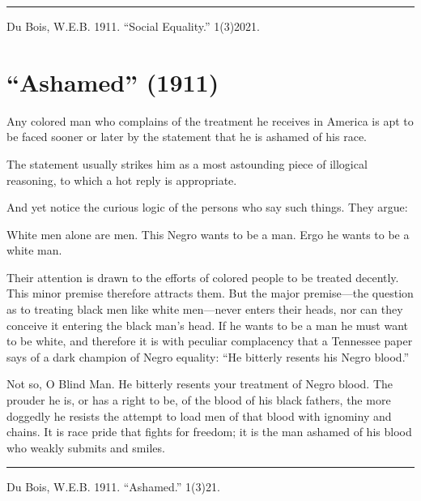 \documentclass[letterpaper,10pt,english]{jupyterBook}
\begin{document}
\bigskip\hrule\bigskip


\sphinxAtStartPar
{} Du Bois, W.E.B. 1911. “Social Equality.”  1(3)20\sphinxhyphen{}21.


\section{“Ashamed” (1911)}
\label{\detokenize{Volumes/01/03/ashamed:ashamed-1911}}\label{\detokenize{Volumes/01/03/ashamed::doc}}
\sphinxAtStartPar
Any colored man who complains of the treatment he receives in America is apt to be faced sooner or later by the statement that he is ashamed of his race.

\sphinxAtStartPar
The statement usually strikes him as a most astounding piece of illogical reasoning, to which a hot reply is appropriate.

\sphinxAtStartPar
And yet notice the curious logic of the persons who say such things. They argue:

\sphinxAtStartPar
White men alone are men. This Negro wants to be a man. Ergo he wants to be a white man.

\sphinxAtStartPar
Their attention is drawn to the efforts of colored people to be treated decently. This minor premise therefore attracts them. But the major premise—the question as to treating black men like white men—never enters their heads, nor can they conceive it entering the black man’s head. If he wants to be a man he must want to be white, and therefore it is with peculiar complacency that a Tennessee paper says of a dark champion of Negro equality: “He bitterly resents his Negro blood.”

\sphinxAtStartPar
Not so, O Blind Man. He bitterly resents your treatment of Negro blood. The prouder he is, or has a right to be, of the blood of his black fathers, the more doggedly he resists the attempt to load men of that blood with ignominy and chains. It is race pride that fights for freedom; it is the man ashamed of his blood who weakly submits and smiles.


\bigskip\hrule\bigskip


\sphinxAtStartPar
{} Du Bois, W.E.B. 1911. “Ashamed.”  1(3)21.
\end{document}

